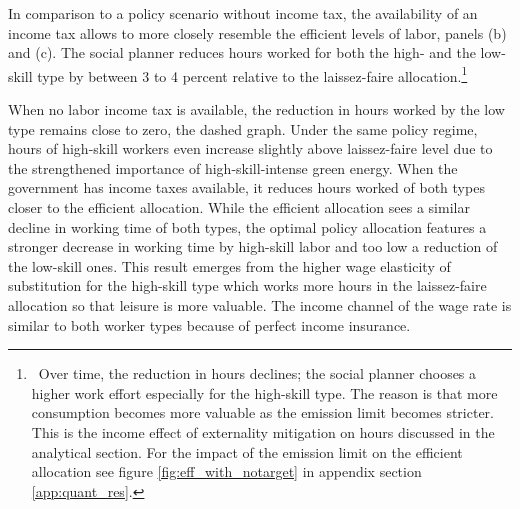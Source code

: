 \begin{figure}[h!!!]
\begin{minipage}[]{0.32\textwidth}
\end{minipage}
\end{figure} 

\clearpage
%
In comparison to a policy scenario without income tax, the availability of an income tax allows to more closely resemble the efficient levels of labor, panels (b) and (c). 
The social planner reduces hours worked for both the high- and the low-skill type by between 3 to 4 percent relative to the laissez-faire allocation.\footnote{\ Over time, the reduction in hours declines; the social planner chooses a higher work effort especially for the high-skill type. The reason is that more consumption becomes more valuable as the emission limit becomes stricter. This is the income effect of  externality mitigation on hours discussed in the analytical section. For the impact of the emission limit on the efficient allocation see figure \ref{fig:eff_with_notarget} in appendix section \ref{app:quant_res}.}


When no labor income tax is available, the reduction in  hours worked by the low type remains close to zero, the dashed graph. Under the same policy regime, hours of high-skill workers even increase slightly above laissez-faire level due to the strengthened importance of high-skill-intense green energy. When the government has income taxes available, it reduces hours worked of both types closer to the efficient allocation. While the efficient allocation sees a similar decline in working time of both types, the optimal policy allocation features a stronger decrease in working time by high-skill labor and too low a reduction of the low-skill ones. This result emerges from the higher wage elasticity of substitution for the high-skill type which works more hours in the laissez-faire allocation so that leisure is more valuable. The income channel of the wage rate is similar to both worker types because of perfect income insurance.

